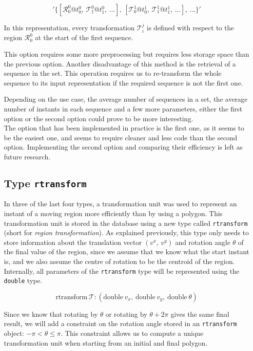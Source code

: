 \[
    '\{[\mathcal{R}_0^0@t_0^0,\ \mathcal{T}_1^0@t_1^0,\ ...],\ [\mathcal{T}_0^1@t_0^1,\ \mathcal{T}_1^1@t_1^1,\ ...],\ ...\}'
\]

In this representation, every transformation $\mathcal{T}_i^j$ is defined with respect to the region $\mathcal{R}_0^0$ at the start of the first sequence.

This option requires some more preprocessing but requires less storage space than the previous option. Another disadvantage of this method is the retrieval of a sequence in the set. This operation requires us to re-transform the whole sequence to its input representation if the required sequence is not the first one.

Depending on the use case, the average number of sequences in a set, the average number of instants in each sequence and a few more parameters, either the first option or the second option could prove to be more interesting. \\

The option that has been implemented in practice is the first one, as it seems to be the easiest one, and seems to require cleaner and less code than the second option. Implementing the second option and comparing their efficiency is left as future research.

\subsection{Type \texttt{rtransform}}

In three of the last four types, a transformation unit was used to represent an instant of a moving region more efficiently than by using a polygon. This transformation unit is stored in the database using a new type called \lstinline{rtransform} (short for \textit{region transformation}). As explained previously, this type only needs to store information about the translation vector $(v^x,\ v^y)$ and rotation angle $\theta$ of the final value of the region, since we assume that we know what the start instant is, and we also assume the centre of rotation to be the centroid of the region. Internally, all parameters of the \lstinline{rtransform} type will be represented using the \lstinline{double} type.

\[
    \text{rtransform}\ \mathcal{T}: (\text{double}\ v_x,\ \text{double}\ v_y,\ \text{double}\ \theta)
\]

Since we know that rotating by $\theta$ or rotating by $\theta + 2\pi$ gives the same final result, we will add a constraint on the rotation angle stored in an \lstinline{rtransform} object: $-\pi < \theta \le \pi$. This constraint allows us to compute a unique transformation unit when starting from an initial and final polygon. \\

